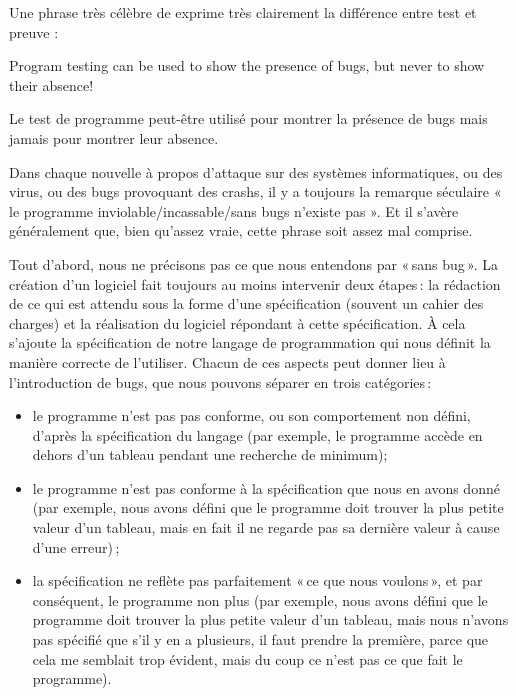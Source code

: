 Une phrase très célèbre de  exprime très clairement la différence entre
test et preuve :



\begin{Quotation}[Dijkstra]
Program testing can be used to show the presence of bugs, but never to show
their absence!
\end{Quotation}



Le test de programme peut-être utilisé pour montrer la présence de bugs mais
jamais pour montrer leur absence.





Dans chaque nouvelle à propos d'attaque sur des systèmes informatiques, ou
des virus, ou des bugs provoquant des crashs, il y a toujours la remarque
séculaire « le programme inviolable/incassable/sans bugs n'existe pas ». Et
il s'avère généralement que, bien qu'assez vraie, cette phrase soit assez
mal comprise.



Tout d’abord, nous ne précisons pas ce que nous entendons par « sans bug ».
La création d’un logiciel fait toujours au moins intervenir deux étapes : la
rédaction de ce qui est attendu sous la forme d’une spécification (souvent
un cahier des charges) et la réalisation du logiciel répondant à cette
spécification. À cela s’ajoute la spécification de notre langage de
programmation qui nous définit la manière correcte de l’utiliser. Chacun de
ces aspects peut donner lieu à l’introduction de bugs, que nous pouvons
séparer en trois catégories :


\begin{itemize}
\item le programme n’est pas pas conforme, ou son comportement non défini,
      d’après la spécification du langage (par exemple, le programme accède
      en dehors d’un tableau pendant une recherche de minimum);
\item le programme n’est pas conforme à la spécification que nous en avons
      donné (par exemple, nous avons défini que le programme doit trouver
      la plus petite valeur d’un tableau, mais en fait il ne regarde pas sa
      dernière valeur à cause d’une erreur) ;
\item la spécification ne reflète pas parfaitement « ce que nous voulons »,
      et par conséquent, le programme non plus (par exemple, nous avons
      défini que le programme doit trouver la plus petite valeur d’un
      tableau, mais nous n’avons pas spécifié que s’il y en a plusieurs, il
      faut prendre la première, parce que cela me semblait trop évident,
      mais du coup ce n’est pas ce que fait le programme).
\end{itemize}


